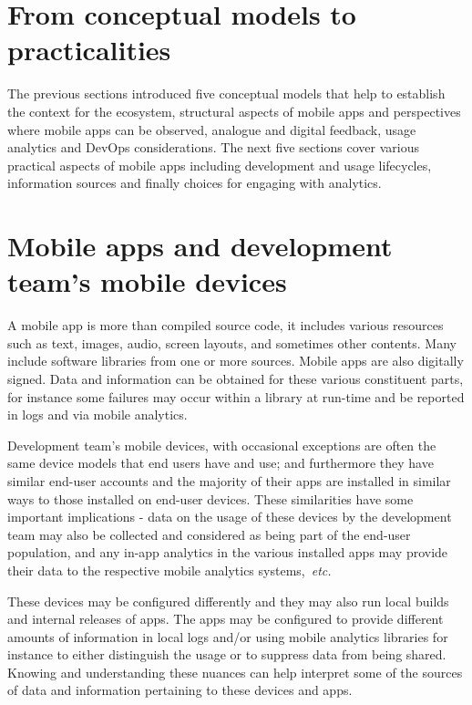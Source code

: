 \section{From conceptual models to practicalities}
The previous sections introduced five conceptual models that help to establish the context for the ecosystem, structural aspects of mobile apps and perspectives where mobile apps can be observed, analogue and digital feedback, usage analytics and DevOps considerations. The next five sections cover various practical aspects of mobile apps including development and usage lifecycles, information sources and finally choices for engaging with analytics.


\section{Mobile apps and development team's mobile devices}
A mobile app is more than compiled source code, it includes various resources such as text, images, audio, screen layouts, and sometimes other contents. Many include software libraries from one or more sources. Mobile apps are also digitally signed. Data and information can be obtained for these various constituent parts, for instance some failures may occur within a library at run-time and be reported in logs and via mobile analytics.

Development team's mobile devices, with occasional exceptions are often the same device models that end users have and use; and furthermore they have similar end-user accounts and the majority of their apps are installed in similar ways to those installed on end-user devices. These similarities have some important implications - data on the usage of these devices by the development team may also be collected and considered as being part of the end-user population, and any in-app analytics in the various installed apps may provide their data to the respective mobile analytics systems,~\emph{etc.}

These devices may be configured differently and they may also run local builds and internal releases of apps. The apps may be configured to provide different amounts of information in local logs and/or using mobile analytics libraries for instance to either distinguish the usage or to suppress data from being shared. Knowing and understanding these nuances can help interpret some of the sources of data and information pertaining to these devices and apps.



